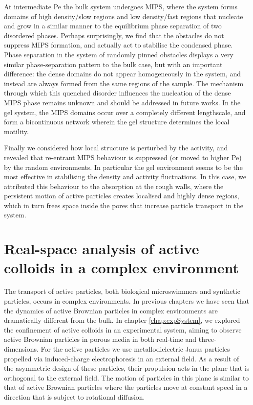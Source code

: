 At intermediate Pe the bulk system undergoes MIPS, where the system forms domains of high density/slow regions and low density/fast regions that nucleate and grow in a similar manner to the equilibrium phase separation of two disordered phases. Perhaps surprisingly, we find that the obstacles do not suppress MIPS formation, and actually act to stabilise the condensed phase. Phase separation in the system of randomly pinned obstacles displays a very similar phase-separation pattern to the bulk case, but with an important difference:  the dense domains do not appear homogeneously in the system, and instead are always formed from the same regions of the sample. The mechanism through which this quenched disorder influences the nucleation of the dense MIPS phase remains unknown and should be addressed in future works. In the gel system, the MIPS domains occur over a completely different lengthscale, and form a bicontinuous network wherein the gel structure determines the local motility.

Finally we considered how local structure is perturbed by the activity, and revealed that re-entrant MIPS behaviour is suppressed (or moved to higher Pe) by the random environments. In particular the gel environment seems to be the most effective in stabilising the density and activity fluctuations. In this case, we attributed this behaviour to the absorption at the rough walls, where the persistent motion of active particles creates localised and highly dense regions, which in turn frees space inside the pores that increase particle transport in the system.



\section{Real-space analysis of active colloids in a complex environment}

The transport of active particles, both biological microswimmers and synthetic particles, occurs in complex environments. In previous chapters we have seen that the dynamics of active Brownian particles in complex environments are dramatically different from the bulk. In chapter \ref{chap:expSystem}, we explored the confinement of active colloids in an experimental system, aiming to observe active Brownian particles in porous media in both real-time and three-dimensions.
For the active particles we use metallodielectric Janus particles propelled via induced-charge electrophoresis in an external field. As a result of the asymmetric design of these particles, their propulsion acts in the plane that is orthogonal to the external field. The motion of particles in this plane is similar to that of active Brownian particles where the particles move at constant speed in a direction that is subject to rotational diffusion. 

